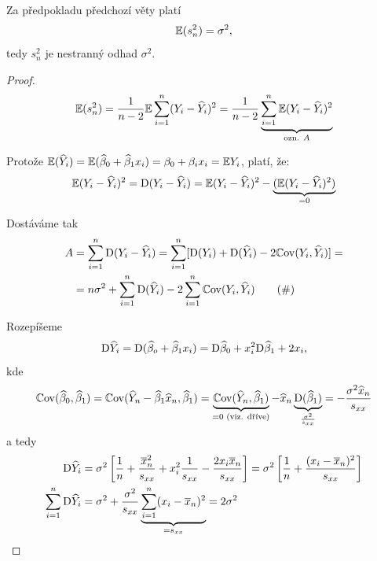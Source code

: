 

\begin{theorem}
	Za předpokladu předchozí věty platí
	$$
		\mathbb{E} (s_n^2) = \sigma^2,
	$$
	tedy $s_n^2$ je nestranný odhad $\sigma^2$.
\end{theorem}


\begin{proof}
	$$
		\mathbb{E}(s_n^2)  = \frac{1}{n-2} \mathbb{E} \sum_{i=1}^{n} (Y_i - \widehat{Y}_i)^2 = \frac{1}{n-2} \underbrace{\sum\limits_{i=1}^{n} \mathbb{E} (Y_i - \widehat{Y}_i)^2}_{\text{ozn. } A}
	$$
	
	Protože $\mathbb{E}(\widehat{Y}_i)  = \mathbb{E}(\widehat{\beta}_0 + \widehat{\beta}_1 x_i) = \beta_0 + \beta_i x_i = \mathbb{E} Y_i$, platí, že:
	$$
	\mathbb{E}(Y_i - \widehat{Y}_i)^2   = \mathrm{D}(Y_i - \widehat{Y}_i) = \mathbb{E} (Y_i - \widehat{Y}_i)^2 - \underbrace{(\mathbb{E}(Y_i - \widehat{Y}_i)^2)}_{= 0}
	$$
	
	Dostáváme tak	
	\begin{align*}
		A & = \sum_{i=1}^{n} \mathrm{D}(Y_i - \widehat{Y}_i) = \sum_{i=1}^n [ \mathrm{D}(Y_i) + \mathrm{D}(\widehat{Y}_i) - 2 \mathbb{C}\mathrm{ov}(Y_i, \widehat{Y}_i) ] =  \\
		& = n \sigma^2 + \sum_{i=1}^n \mathrm{D}(\widehat{Y}_i) - 2 \sum_{i=1}^n \mathbb{C}\mathrm{ov}(Y_i, \widehat{Y}_i) \tag{$\#$}
	\end{align*}
	
	Rozepíšeme
	$$
		\mathrm{D} \widehat{Y}_i  = \mathrm{D}(\widehat{\beta}_o + \widehat{\beta}_1 x_i) = \mathrm{D} \widehat{\beta}_0 + x_i^2 \mathrm{D} \widehat{\beta}_1 + 2 x_i,
	$$
	kde
	$$
		\mathbb{C}\mathrm{ov}(\widehat{\beta}_0, \widehat{\beta}_1) = \mathbb{C}\mathrm{ov}(\widehat{Y}_n - \widehat{\beta}_1 \widehat{x}_n, \widehat{\beta}_1) = \underbrace{\mathbb{C}\mathrm{ov}(\widehat{Y}_n, \widehat{\beta}_1)}_{= 0 \text{ (viz. dříve)}} - \widehat{x}_n \underbrace{\mathrm{D}(\widehat{\beta}_1)}_{\frac{\sigma^2}{s_{xx}}} = -\frac{\sigma^2 \widehat{x}_n}{s_{xx}}
	$$
	a tedy
	\begin{align*}
		\mathrm{D} \widehat{Y}_i & = \sigma^2 \left[ \frac{1}{n} + \frac{\overline{x}_n^2}{s_{xx}} + x_i^2 \frac{1}{s_{xx}} - \frac{2 x_i \overline{x}_n}{s_{xx}} \right] = \sigma^2 \left[ \frac{1}{n} + \frac{(x_i - \overline{x}_n)^2}{s_{xx}}\right] \\
		\sum_{i=1}^n \mathrm{D} \widehat{Y}_i & = \sigma^2 + \frac{\sigma^2}{s_{xx}} \underbrace{\sum_{i=1}^n (x_i - \overline{x}_n)^2}_{ = s_{xx}} = 2\sigma^2
	\end{align*}
	

\end{proof}
